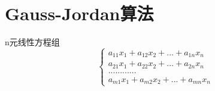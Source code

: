 \section{Gauss-Jordan算法}
\begin{definition}{n元线性方程组}{}
  \[\begin{cases}
     a_{11} x_1+a_{12} x_2+...+a_{1n} x_n\\
     a_{21} x_1+a_{22} x_2+...+a_{2n} x_n\\
     ............\\
     a_{m1} x_1+a_{m2} x_2+...+a_{mn} x_n
  \end{cases}\]
\end{definition}



